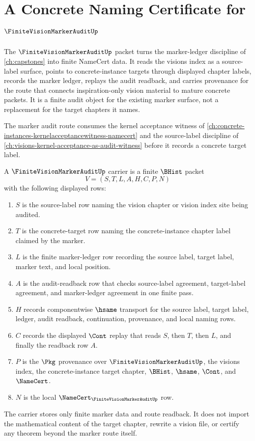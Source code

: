 \chapter{A Concrete Naming Certificate for $\FiniteVisionMarkerAuditUp$}
\label{ch:concrete-instances-finite-vision-marker-audit-namecert}

The $\FiniteVisionMarkerAuditUp$ packet turns the marker-ledger discipline of \autoref{ch:capstones} into finite NameCert data. It reads the visions index as a source-label surface, points to concrete-instance targets through displayed chapter labels, records the marker ledger, replays the audit readback, and carries provenance for the route that connects inspiration-only vision material to mature concrete packets. It is a finite audit object for the existing marker surface, not a replacement for the target chapters it names.

The marker audit route consumes the kernel acceptance witness of \autoref{ch:concrete-instances-kernelacceptancewitness-namecert} and the source-label discipline of \autoref{ch:visions-kernel-acceptance-as-audit-witness} before it records a concrete target label.

\begin{definition}
\label{def:finite-vision-marker-audit-carrier}
A $\FiniteVisionMarkerAuditUp$ carrier is a finite $\BHist$ packet
$$
V=(S,T,L,A,H,C,P,N)
$$
with the following displayed rows:
\begin{enumerate}
\item $S$ is the source-label row naming the vision chapter or vision index site being audited.
\item $T$ is the concrete-target row naming the concrete-instance chapter label claimed by the marker.
\item $L$ is the finite marker-ledger row recording the source label, target label, marker text, and local position.
\item $A$ is the audit-readback row that checks source-label agreement, target-label agreement, and marker-ledger agreement in one finite pass.
\item $H$ records componentwise $\hsame$ transport for the source label, target label, ledger, audit readback, continuation, provenance, and local naming rows.
\item $C$ records the displayed $\Cont$ replay that reads $S$, then $T$, then $L$, and finally the readback row $A$.
\item $P$ is the $\Pkg$ provenance over $\FiniteVisionMarkerAuditUp$, the visions index, the concrete-instance target chapter, $\BHist$, $\hsame$, $\Cont$, and $\NameCert$.
\item $N$ is the local $\NameCert_{\FiniteVisionMarkerAuditUp}$ row.
\end{enumerate}
The carrier stores only finite marker data and route readback. It does not import the mathematical content of the target chapter, rewrite a vision file, or certify any theorem beyond the marker route itself.
\end{definition}

